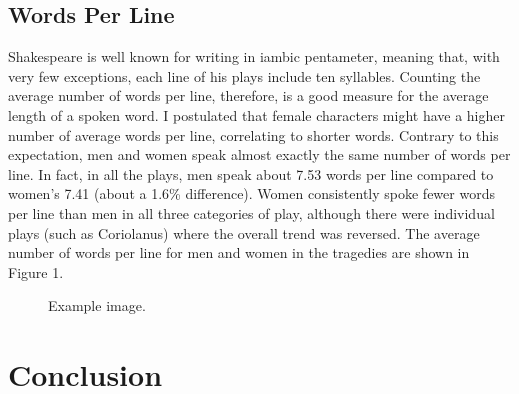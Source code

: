\documentclass[12pt]{article} %
\begin{document}
\subsection{Words Per Line} %
Shakespeare is well known for writing in iambic pentameter, meaning that, with very few exceptions, each line of his plays include ten syllables. Counting the average number of words per line, therefore, is a good measure for the average length of a spoken word. I postulated that female characters might have a higher number of average words per line, correlating to shorter words. Contrary to this expectation, men and women speak almost exactly the same number of words per line. In fact, in all the plays, men speak about 7.53 words per line compared to women's 7.41 (about a 1.6\% difference). Women consistently spoke fewer words per line than men in all three categories of play, although there were individual plays (such as Coriolanus) where the overall trend was reversed. The average number of words per line for men and women in the tragedies are shown in Figure 1.

\begin{figure}[H] %
\caption{Example image.}
\label{fig:speciation}
\end{figure}






\section{Conclusion} %
\end{document}
